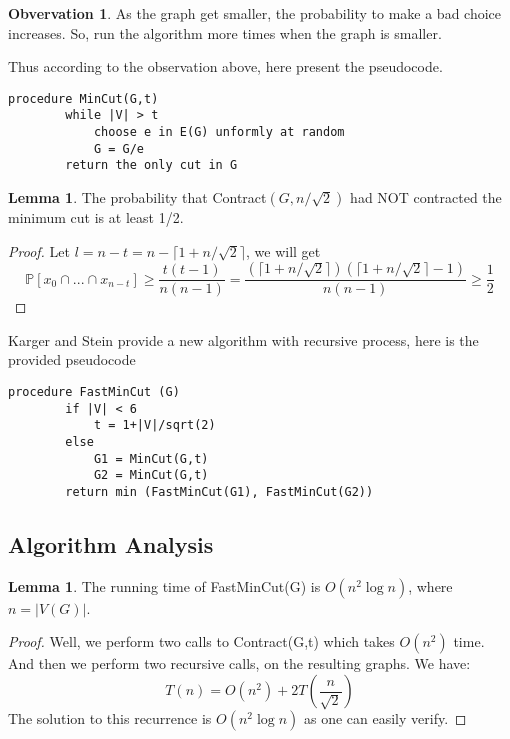 \documentclass[11pt]{article}
\theoremstyle{plain}
\theoremstyle{definition}
\newtheorem{lem}[thm]{Lemma}
\newtheorem{obser}[thm]{Obvervation}
\theoremstyle{remark}
\begin{document}
	\begin{obser}
	As the graph get smaller, the probability to make a bad choice increases. So, run the algorithm more times when the graph is smaller.
	\end{obser}
	
	Thus according to the observation above, here present the pseudocode.
	\begin{center}
		\begin{Verbatim}[frame = single]
		procedure MinCut(G,t)
		while |V| > t
			choose e in E(G) unformly at random
			G = G/e
		return the only cut in G
		\end{Verbatim}
	\end{center}
	
	\begin{lem}
	The probability that Contract$ (G,n/\sqrt{2}) $ had NOT contracted the minimum cut is at least 1/2.
	\end{lem}
	\begin{proof}
	Let $ l=n-t=n-\lceil 1+n/\sqrt{2} \rceil $, we will get  \[ \mathbb{P}[x_0\cap ... \cap x_{n-t}] \geq \frac{t(t-1)}{n(n-1)}= \frac{(\lceil 1+n/\sqrt{2} \rceil)(\lceil 1+n/\sqrt{2} \rceil-1)}{n(n-1)} \geq \frac{1}{2} \]
	\end{proof}
	
	Karger and Stein provide a new algorithm with recursive process, here is the provided pseudocode 
	\begin{center}
		\begin{Verbatim}[frame = single]
		procedure FastMinCut (G)
		if |V| < 6
			t = 1+|V|/sqrt(2)
		else
			G1 = MinCut(G,t)
			G2 = MinCut(G,t)
		return min (FastMinCut(G1), FastMinCut(G2))
		\end{Verbatim}
	\end{center}
	
	\subsection{Algorithm Analysis}
	
	\begin{lem}
		The running time of FastMinCut(G) is $ O(n^2 \log n) $, where $ n=|V(G)| $.
	\end{lem}
	\begin{proof}
		Well, we perform two calls to Contract(G,t) which takes $ O(n^2) $ time. And then we perform two recursive calls, on the resulting graphs. We have:\[ T(n)=O(n^2)+2T(\frac{n}{\sqrt{2}}) \]
		The solution to this recurrence is $ O(n^2 \log n) $ as one can easily verify.
	\end{proof}
	
\end{document}

